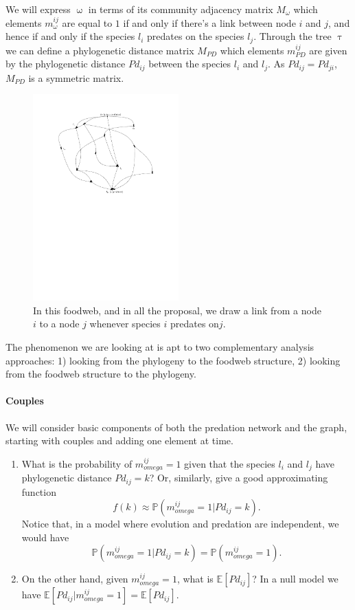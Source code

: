 \documentclass[12pt,a4paper]{report}
\begin{document}
We will express $\upomega$ in terms of its community adjacency matrix $M_{\omega}$ which elements $m_{\omega}^{ij}$ are equal to $1$ if and only if there's a link between node $i$ and $j$, and hence if and only if the species $l_i$ predates on the species $l_j$. Through the tree $\uptau$ we can define a phylogenetic distance matrix $M_{PD}$ which elements $m_{PD}^{ij}$ are given by the phylogenetic distance $Pd_{ij}$ between the species $l_i$ and $l_j$. As $Pd_{ij} = Pd_{ji}$, $M_{PD}$ is a symmetric matrix.
\begin{figure}[h]
	\centering
		\includegraphics[width=0.5\textwidth]{images/foodweb}
		\caption{In this foodweb, and in all the proposal, we draw a link from a node $i$ to a node $j$ whenever species $i$ predates on$j$.}
		\label{fig:foodweb}
\end{figure}

The phenomenon we are looking at is apt to two complementary analysis approaches: 1) looking from the phylogeny to the foodweb structure, 2) looking from the foodweb structure to the phylogeny.

\paragraph{Couples}

We will consider basic components of both the predation network and the graph, starting with couples and adding one element at time.

\begin{enumerate}
\item What is the probability of $m_{omega}^{ij} = 1$ given that the species $l_i$ and $l_j$ have phylogenetic distance $Pd_{ij}=k$? Or, similarly, give a good approximating function \[f(k) \approx \mathbb{P}(m_{omega}^{ij} = 1 | Pd_{ij}=k ).\]
Notice that, in a model where evolution and predation are independent, we would have \[\mathbb{P}(m_{omega}^{ij} = 1 | Pd_{ij}=k ) = \mathbb{P}(m_{omega}^{ij} = 1) .\]

\item On the other hand, given $m_{omega}^{ij} = 1$, what is $\mathbb{E}\left[Pd_{ij}\right]$?
In a null model we have $\mathbb{E}\left[Pd_{ij} | m_{omega}^{ij} = 1 \right] = \mathbb{E}\left[Pd_{ij}\right]$.
\end{enumerate}
\end{document}
